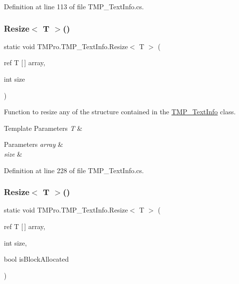 Definition at line 113 of file T\+M\+P\+\_\+\+Text\+Info.\+cs.

\mbox{\label{class_t_m_pro_1_1_t_m_p___text_info_a3d0a1c4a3f618976099dbaa0473395ff}} 
\subsubsection{\texorpdfstring{Resize$<$ T $>$()}{Resize< T >()}\hspace{0.1cm}{\footnotesize\ttfamily [1/2]}}
{\footnotesize\ttfamily static void T\+M\+Pro.\+T\+M\+P\+\_\+\+Text\+Info.\+Resize$<$ T $>$ (\begin{DoxyParamCaption}\item[{ref T \mbox{[}$\,$\mbox{]}}]{array,  }\item[{int}]{size }\end{DoxyParamCaption})\hspace{0.3cm}{\ttfamily [static]}}



Function to resize any of the structure contained in the \mbox{\hyperlink{class_t_m_pro_1_1_t_m_p___text_info}{T\+M\+P\+\_\+\+Text\+Info}} class. 


\begin{DoxyTemplParams}{Template Parameters}
{\em T} & \\
\hline
\end{DoxyTemplParams}

\begin{DoxyParams}{Parameters}
{\em array} & \\
\hline
{\em size} & \\
\hline
\end{DoxyParams}


Definition at line 228 of file T\+M\+P\+\_\+\+Text\+Info.\+cs.

\mbox{\label{class_t_m_pro_1_1_t_m_p___text_info_aef15865763027788edc0ed4eceb57d1c}} 
\subsubsection{\texorpdfstring{Resize$<$ T $>$()}{Resize< T >()}\hspace{0.1cm}{\footnotesize\ttfamily [2/2]}}
{\footnotesize\ttfamily static void T\+M\+Pro.\+T\+M\+P\+\_\+\+Text\+Info.\+Resize$<$ T $>$ (\begin{DoxyParamCaption}\item[{ref T \mbox{[}$\,$\mbox{]}}]{array,  }\item[{int}]{size,  }\item[{bool}]{is\+Block\+Allocated }\end{DoxyParamCaption})\hspace{0.3cm}{\ttfamily [static]}}



